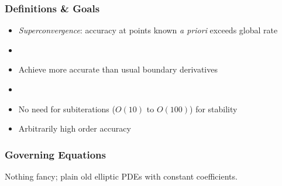 \documentclass[8pt]{beamer}
\begin{document}
\begin{frame}
    \frametitle{Definitions \& Goals}
    \begin{itemize}
        \item \emph{Superconvergence}: accuracy at points known \emph{a priori}
              exceeds global rate
        \item
    \end{itemize}
    \pause
    \begin{itemize}
        \item Achieve more accurate than usual boundary derivatives
        \item
        \item No need for subiterations (\(O(10)\) to \(O(100)\)) for stability
        \item Arbitrarily high order accuracy
    \end{itemize}
\end{frame}

\begin{frame}
    \frametitle{Governing Equations}
    Nothing fancy; plain old elliptic PDEs with constant coefficients.
\end{frame}
\end{document}
